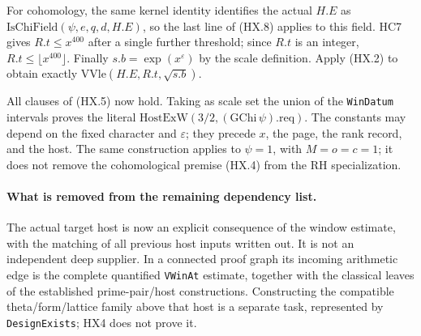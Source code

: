 For cohomology, the same kernel identity identifies the actual
$H.E$ as $\mathrm{IsChiField}(\psi,e,q,d,H.E)$, so the last line of
(HX.8) applies to this field.  HC7 gives $R.t\le x^{400}$ after a
single further threshold; since $R.t$ is an integer,
$R.t\le\lfloor x^{400}\rfloor$.  Finally
$s.b=\exp(x^\varepsilon)$ by the scale definition.  Apply (HX.2)
to obtain exactly $\mathrm{VVle}(H.E,R.t,\sqrt{s.b})$.

All clauses of (HX.5) now hold.  Taking as scale set the union of
the \texttt{WinDatum} intervals proves the literal
$\mathrm{HostExW}(3/2,(\mathrm{GChi}\,\psi).\mathrm{req})$.
The constants may depend on the fixed character and $\varepsilon$;
they precede $x$, the page, the rank record, and the host.  The same
construction applies to $\psi=1$, with $M=o=c=1$; it does not
remove the cohomological premise (HX.4) from the RH specialization.

\paragraph{What is removed from the remaining dependency list.}
The actual target host is now an explicit consequence of the window
estimate, with the matching of all previous host inputs written out.
It is not an independent deep supplier.  In a connected proof graph
its incoming arithmetic edge is the complete quantified
\texttt{VWinAt} estimate, together with the classical leaves of
the established prime-pair/host constructions.  Constructing the
compatible theta/form/lattice family above that host is a separate
task, represented by \texttt{DesignExists}; HX4 does not prove it.
